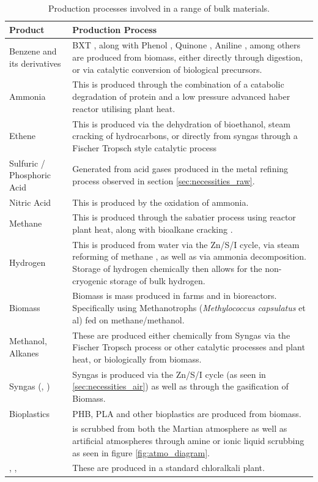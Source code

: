 \documentclass[fleqn,10pt]{Stylesheet} %
\begin{document}
\begin{table}[t]

\centering
\begin{tabular}{|m{4cm}|L|}\hline
\textbf{Product} & \textbf{Production Process} \\\hline
Benzene and its derivatives &	BXT \cite{QingfengChe2019}, along with Phenol \cite{2001Gibson}, Quinone \cite{NingqingRan2001}, Aniline \cite{Pharkya2020}, among others \cite{JianLi2017} are produced from biomass, either directly through digestion, or via catalytic conversion of biological precursors. \\\hline
Ammonia & This is produced through the combination of a catabolic degradation of protein \cite{KwonYoungChoi2014} and a low pressure advanced haber reactor \cite{BosongLin2019} utilising plant heat.\\\hline
Ethene & This is produced via the dehydration of bioethanol, steam cracking of hydrocarbons, or directly from syngas through a Fischer Tropsch style catalytic process \\\hline
Sulfuric / Phosphoric Acid &  Generated from acid gases produced in the metal refining process observed in section \ref{sec:necessities_raw}. \\\hline
Nitric Acid & This is produced by the oxidation of ammonia.\\\hline
Methane & This is produced through the sabatier \cite{JohnBucknell2014} process using reactor plant heat, along with bioalkane cracking \cite{2004JoseComas, XWang2002}.\\\hline
Hydrogen &  This is produced from water via the Zn/S/I cycle, via steam reforming of methane \cite{JianhuaTong2006}, as well as via ammonia decomposition. Storage of hydrogen chemically then allows for the non-cryogenic storage of bulk hydrogen.\\\hline
Biomass & Biomass is mass produced in farms and in bioreactors. Specifically using Methanotrophs (\textit{Methylococcus capsulatus} et al) fed on methane/methanol. \\\hline
Methanol, Alkanes & These are produced either chemically from Syngas via the Fischer Tropsch process or other catalytic processes and plant heat, or biologically from biomass. \\\hline
Syngas (, ) & Syngas is produced via the Zn/S/I cycle (as seen in \ref{sec:necessities_air}) as well as through the gasification of Biomass. \\\hline
Bioplastics & PHB, PLA and other bioplastics are produced from biomass. \\\hline
{} &  is scrubbed from both the Martian atmosphere as well as artificial atmospheres through amine or ionic liquid scrubbing \cite{Lotto2018,StephenYates2016} as seen in figure \ref{fig:atmo_diagram}. \\\hline
{}, ,  & These are produced in a standard chloralkali plant. \\\hline
\end{tabular}
\caption{Production processes involved in a range of bulk materials.}
\label{tab:bulk_products}
\end{table}
\end{document}
